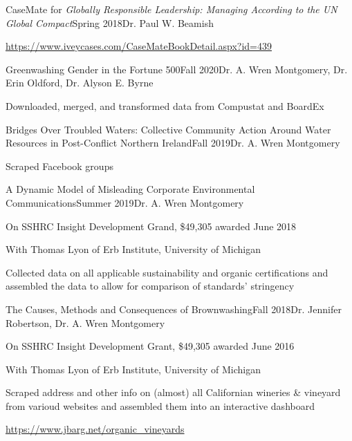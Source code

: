 \documentclass{gradstudentresume}
\begin{document}
	\begin{desc}{CaseMate for \textit{Globally Responsible Leadership: Managing According to the UN Global Compact}}{Spring 2018}{Dr. Paul W. Beamish}
		\item \url{https://www.iveycases.com/CaseMateBookDetail.aspx?id=439}
	\end{desc}



	\largespace

	\begin{desc}{Greenwashing Gender in the Fortune 500}{Fall 2020}{Dr. A. Wren Montgomery, Dr. Erin Oldford, Dr. Alyson E. Byrne}
		\item Downloaded, merged, and transformed data from Compustat and BoardEx	
	\end{desc}

	\begin{desc}{Bridges Over Troubled Waters: Collective Community Action Around Water Resources in Post-Conflict Northern Ireland}{Fall 2019}{Dr. A. Wren Montgomery}
		\item Scraped Facebook groups
	\end{desc}

	\begin{desc}{A Dynamic Model of Misleading Corporate Environmental Communications}{Summer 2019}{Dr. A. Wren Montgomery}
		\item On SSHRC Insight Development Grand, \$49,305 awarded June 2018
		\item With Thomas Lyon of Erb Institute, University of Michigan
		\item Collected data on all applicable sustainability and organic certifications and assembled the data to allow for comparison of standards’ stringency
	\end{desc}

	\begin{desc}{The Causes, Methods and Consequences of Brownwashing}{Fall 2018}{Dr. Jennifer Robertson,  Dr. A. Wren Montgomery}
		\item On SSHRC Insight Development Grant, \$49,305 awarded June 2016
		\item With Thomas Lyon of Erb Institute, University of Michigan
		\item Scraped address and other info on (almost) all Californian wineries \& vineyard from varioud websites and assembled them into an interactive dashboard
		\item \url{https://www.jbarg.net/organic_vineyards}
	\end{desc}
\end{document}
